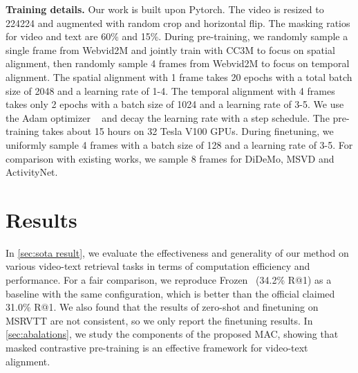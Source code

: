 \documentclass[10pt,twocolumn,letterpaper]{article}
\begin{document}
\vspace{1mm}\noindent\textbf{Training details.} Our work is built upon Pytorch. The video is resized to 224224 and augmented with random crop and horizontal flip. The masking ratios for video and text are 60\% and 15\%. During pre-training, we randomly sample a single frame from Webvid2M and jointly train with CC3M to focus on spatial alignment, then randomly sample 4 frames from Webvid2M to focus on temporal alignment. The spatial alignment with 1 frame takes 20 epochs with a total batch size of 2048 and a learning rate of 1-4. The temporal alignment with 4 frames takes only 2 epochs with a batch size of 1024 and a learning rate of 3-5. We use the Adam optimizer ~\cite{adam} and decay the learning rate with a step schedule. The pre-training takes about 15 hours on 32 Tesla V100 GPUs. During finetuning, we uniformly sample 4 frames with a batch size of 128 and a learning rate of 3-5. For comparison with existing works, we sample 8 frames for DiDeMo, MSVD and ActivityNet.



\vspace{-1mm}\section{Results}
In \cref{sec:sota result}, we evaluate the effectiveness and generality of our method on various video-text retrieval tasks in terms of computation efficiency and performance. For a fair comparison, we reproduce Frozen ~\cite{Frozen}(34.2\% R@1) as a baseline with the same configuration, which is better than the official claimed 31.0\% R@1. We also found that the results of zero-shot and finetuning on MSRVTT are not consistent, so we only report the finetuning results. In \cref{sec:abalations}, we study the components of the proposed MAC, showing that masked contrastive pre-training is an effective framework for video-text alignment.  
\end{document}
